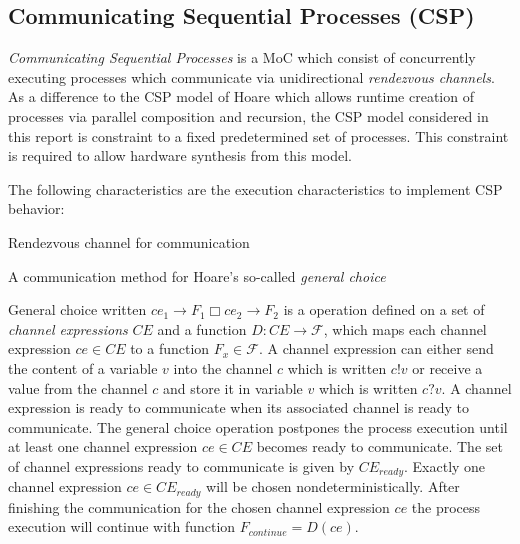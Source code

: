 \subsection{Communicating Sequential Processes (CSP)}
\emph{Communicating Sequential Processes} \cite{csphoare:1985}
is a MoC which consist of concurrently executing processes
which communicate via unidirectional \emph{rendezvous channels}.
As a difference to the CSP model of Hoare \cite{csphoare:1985}
which allows runtime creation of processes via parallel
composition and recursion, the CSP model considered in this report
is constraint to a fixed predetermined set of processes.
This constraint is required to allow hardware synthesis from this
model.

The following characteristics are the execution characteristics to
implement CSP behavior:

\begin{characteristic}\label{characteristic-csp-rendezvous}
  Rendezvous channel for communication
\end{characteristic}

\begin{characteristic}\label{characteristic-csp-general-choice}
  A communication method for Hoare's so-called \emph{general choice}
  
  General choice written $ce_{1} \to F_1 \Box ce_{2} \to F_2$
  is a operation defined on a set of \emph{channel expressions} $CE$ and
  a function $D: CE \to \mathcal{F}$, which maps each channel expression
  $ce \in CE$ to a function $F_{x} \in \mathcal{F}$. A channel
  expression can either send the content of a variable $v$ into
  the channel $c$ which is written $c!v$ or receive a value from
  the channel $c$ and store it in variable $v$ which is written
  $c?v$. A channel expression is ready to communicate when its
  associated channel is ready to communicate.
  The general choice operation postpones the process execution 
  until at least one channel expression $ce \in CE$
  becomes ready to communicate. The set of channel expressions
  ready to communicate is given by $CE_{ready}$.
  Exactly one channel expression $ce \in CE_{ready}$
  will be chosen nondeterministically. After
  finishing the communication for the chosen channel expression $ce$
  the process execution will continue
  with function $F_{continue} = D(ce)$.

\end{characteristic}

